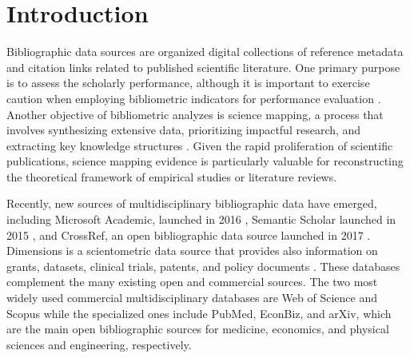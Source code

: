 \section{Introduction}
Bibliographic data sources are organized digital collections of reference metadata and citation links related to published scientific literature. One primary purpose is to assess the scholarly performance, although it is important to exercise caution when employing bibliometric indicators for performance evaluation \citep{van2013scientists, hicks2015bibliometrics, priem2011altmetrics}. Another objective of bibliometric analyzes is science mapping, a process that involves synthesizing extensive data, prioritizing impactful research, and extracting key knowledge structures \citep{chen2017science}. Given the rapid proliferation of scientific publications, science mapping evidence is particularly valuable for reconstructing the theoretical framework of empirical studies or literature reviews.


Recently, new sources of multidisciplinary bibliographic data have emerged, including Microsoft Academic, launched in 2016 \citep{sinha2015overview, wang2019review, wang2020microsoft}, Semantic Scholar launched in 2015 \citep{ammar2018construction}, and CrossRef, an open bibliographic data source launched in 2017 \citep{hendricks2020crossref, van2018crossref}.  Dimensions is a scientometric data source that provides also information on grants, datasets, clinical trials, patents, and policy documents \citep{herzog2020dimensions, hook2018dimensions}. These databases complement the many existing open and commercial sources. The two most widely used commercial multidisciplinary databases are Web of Science and Scopus while the specialized ones include PubMed, EconBiz, and arXiv, which are the main open bibliographic sources for medicine, economics, and physical sciences and engineering, respectively.

